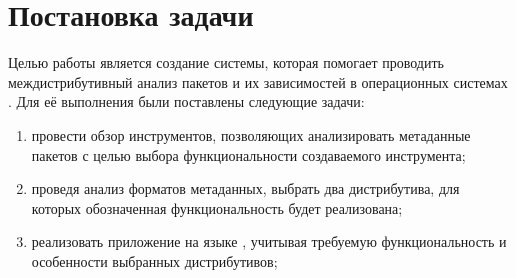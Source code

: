 
\section{Постановка задачи}
\label{sec:task}
Целью работы является создание системы, которая помогает проводить междистрибутивный анализ пакетов и их зависимостей в операционных системах {\linux}.
Для её выполнения были поставлены следующие задачи:
\begin{enumerate}
	\item провести обзор инструментов, позволяющих анализировать метаданные пакетов с целью выбора функциональности создаваемого инструмента;
	\item проведя анализ форматов метаданных, вы\-брать два дистрибутива, для которых обозначенная функциональность будет реализована;
	\item реализовать приложение на языке {\python}, учитывая требуемую функциональность и особенности выбранных дистрибутивов;
\end{enumerate}
